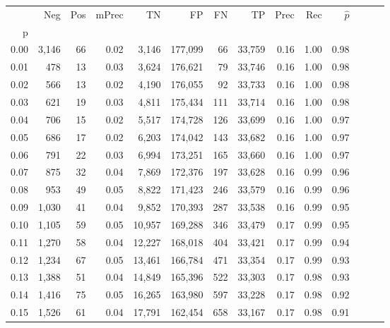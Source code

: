 \begin{tabular}{rrrrrrrrrrrrrr}
\toprule
{} &    Neg &  Pos & mPrec &       TN &       FP &      FN &      TP &  Prec &   Rec & $\hat{p}$ \\
p    &        &      &       &          &          &         &         &       &       &           \\
\midrule
0.00 &  3,146 &   66 &  0.02 &    3,146 &  177,099 &      66 &  33,759 &  0.16 &  1.00 &      0.98 \\
0.01 &    478 &   13 &  0.03 &    3,624 &  176,621 &      79 &  33,746 &  0.16 &  1.00 &      0.98 \\
0.02 &    566 &   13 &  0.02 &    4,190 &  176,055 &      92 &  33,733 &  0.16 &  1.00 &      0.98 \\
0.03 &    621 &   19 &  0.03 &    4,811 &  175,434 &     111 &  33,714 &  0.16 &  1.00 &      0.98 \\
0.04 &    706 &   15 &  0.02 &    5,517 &  174,728 &     126 &  33,699 &  0.16 &  1.00 &      0.97 \\
0.05 &    686 &   17 &  0.02 &    6,203 &  174,042 &     143 &  33,682 &  0.16 &  1.00 &      0.97 \\
0.06 &    791 &   22 &  0.03 &    6,994 &  173,251 &     165 &  33,660 &  0.16 &  1.00 &      0.97 \\
0.07 &    875 &   32 &  0.04 &    7,869 &  172,376 &     197 &  33,628 &  0.16 &  0.99 &      0.96 \\
0.08 &    953 &   49 &  0.05 &    8,822 &  171,423 &     246 &  33,579 &  0.16 &  0.99 &      0.96 \\
0.09 &  1,030 &   41 &  0.04 &    9,852 &  170,393 &     287 &  33,538 &  0.16 &  0.99 &      0.95 \\
0.10 &  1,105 &   59 &  0.05 &   10,957 &  169,288 &     346 &  33,479 &  0.17 &  0.99 &      0.95 \\
0.11 &  1,270 &   58 &  0.04 &   12,227 &  168,018 &     404 &  33,421 &  0.17 &  0.99 &      0.94 \\
0.12 &  1,234 &   67 &  0.05 &   13,461 &  166,784 &     471 &  33,354 &  0.17 &  0.99 &      0.93 \\
0.13 &  1,388 &   51 &  0.04 &   14,849 &  165,396 &     522 &  33,303 &  0.17 &  0.98 &      0.93 \\
0.14 &  1,416 &   75 &  0.05 &   16,265 &  163,980 &     597 &  33,228 &  0.17 &  0.98 &      0.92 \\
0.15 &  1,526 &   61 &  0.04 &   17,791 &  162,454 &     658 &  33,167 &  0.17 &  0.98 &      0.91 \\

\end{tabular}
